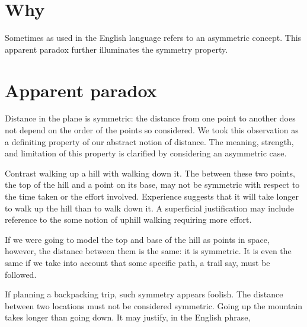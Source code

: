

\section*{Why}

Sometimes  as used in the English language
refers to an asymmetric concept.
This apparent paradox further illuminates the symmetry property.

\section*{Apparent paradox}

Distance in the plane is symmetric: the distance from one point to another does not depend on the order of the points so considered.
We took this observation as a definiting property of our abstract notion of distance.
The meaning, strength, and limitation of this property is clarified by considering an asymmetric case.

Contrast walking up a hill with walking down it.
The  between these two points, the top of the hill and a point on its base, may not be symmetric with respect to the time taken or the effort involved.
Experience suggests that it will take longer to walk up the hill than to walk down it.
A superficial justification may include reference to the some notion of uphill walking requiring more effort.

If we were going to model the top and base of the hill as points in space, however, the distance between them is the same: it is symmetric.
It is even the same if we take into account that some specific path, a trail say, must be followed.

If planning a backpacking trip, such symmetry appears foolish.
The distance between two locations must not be considered symmetric.
Going up the mountain takes longer than going down.
It may justify, in the English phrase, 

